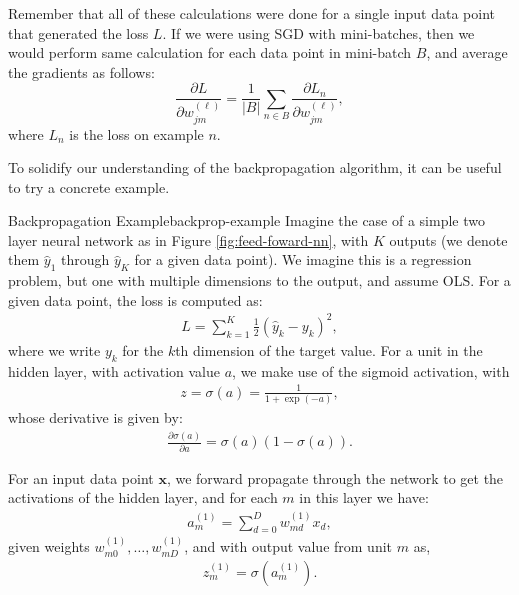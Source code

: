 Remember that all of these calculations were done for a single input data point that generated the loss $L$. If we were using SGD with  mini-batches, then we would perform  same calculation for each data point in mini-batch $B$, and average the gradients as follows:
%
\begin{equation} \label{batch-errors-backprop}
	\frac{\partial L}{\partial w^{(\ell)}_{jm}} = \frac{1}{|B|}\sum_{n\in B} \frac{\partial L_{n}}{\partial w^{(\ell)}_{jm}},
      \end{equation}
      where $L_n$ is the loss on example $n$.
     
To solidify our understanding of the backpropagation algorithm, it can be useful to try a concrete example.
%
\begin{example}{Backpropagation Example}{backprop-example}
  Imagine the case of a simple two layer neural network as in Figure \ref{fig:feed-foward-nn}, with $K$ outputs (we denote them $\hat{y}_1$ through $\hat{y}_K$ for a given data point). We imagine this is a regression problem, but one
  with multiple dimensions to the output, and assume OLS. For a given data point, the loss is computed as:
	\begin{align*}
		L = \sum_{k=1}^{K} \frac{1}{2}(\hat{y}_{k} - y_{k})^{2},
	\end{align*}
        where we write $y_k$ for the $k$th dimension of the target value.
%
        For a unit in the hidden layer, with activation value $a$, we make use of the sigmoid activation, with 
	\begin{align*}
z=		\sigma(a) = \frac{1}{1 + \exp{(-a)}},
	\end{align*}
	whose derivative is given by:
	\begin{align*}
		\frac{\partial \sigma(a)}{\partial a} = \sigma(a)(1 - \sigma(a)).
	\end{align*}
        
	For an input data point $\textbf{x}$, we forward propagate through the network to get the activations of the hidden layer, and for each $m$ in this layer we have:
	\begin{align*}
		a_{m}^{(1)} = \sum_{d=0}^{D} w^{(1)}_{md} x_{d},
	\end{align*}
    given weights $w^{(1)}_{m0},\ldots, w^{(1)}_{mD}$,   and  with output value from unit $m$ as, 
%
	\begin{align*}
		z^{(1)}_{m} = \sigma{(a^{(1)}_{m})}.
	\end{align*}
        

\end{example}
